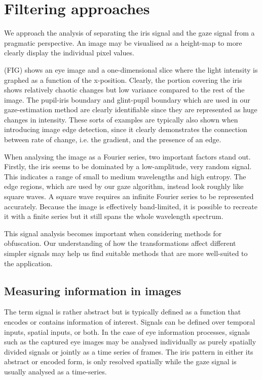 \section{Filtering approaches}
We approach the analysis of separating the iris signal and the gaze signal from a pragmatic perspective. An image may be visualised as a height-map to more clearly display the individual pixel values. 

(FIG) shows an eye image and a one-dimensional slice where the light intensity is graphed as a function of the x-position. Clearly, the portion covering the iris shows relatively chaotic changes but low variance compared to the rest of the image. The pupil-iris boundary and glint-pupil boundary which are used in our gaze-estimation method are clearly identifiable since they are represented as huge changes in intensity. These sorts of examples are typically also shown when introducing image edge detection, since it clearly demonstrates the connection between rate of change, i.e. the gradient, and the presence of an edge. 

When analysing the image as a Fourier series, two important factors stand out. Firstly, the iris seems to be dominated by a low-amplitude, very random signal. This indicates a range of small to medium wavelengths and high entropy. The edge regions, which are used by our gaze algorithm, instead look roughly like square waves. A square wave requires an infinite Fourier series to be represented accurately. Because the image is effectively band-limited, it is possible to recreate it with a finite series but it still spans the whole wavelength spectrum.

This signal analysis becomes important when considering methods for obfuscation. Our understanding of how the transformations affect different simpler signals may help us find suitable methods that are more well-suited to the application.

\subsection{Measuring information in images}
The term signal is rather abstract but is typically defined as a function that encodes or contains information of interest. Signals can be defined over temporal inputs, spatial inputs, or both. In the case of eye information processes, signals such as the captured eye images may be analysed individually as purely spatially divided signals or jointly as a time series of frames. The iris pattern in either its abstract or encoded form, is only resolved spatially while the gaze signal is usually analysed as a time-series. 





